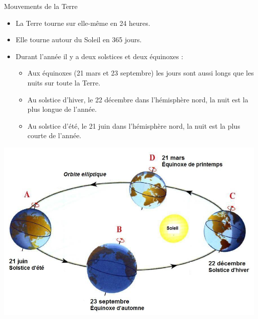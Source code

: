\documentclass[xcolor={dvipsnames}]{beamer}
\begin{document}
\begin{frame}

\begin{block}{Mouvements de la Terre }
	\begin{itemize}
		\item La Terre tourne sur elle-même en 24 heures.
		\item Elle tourne autour du Soleil en 365 jours.
		\item Durant l'année il y a deux solstices et deux équinoxes :
			\begin{itemize}
				\item Aux équinoxes (21 mars et 23 septembre) les jours sont aussi longs que les nuits sur toute la Terre.  
				\item Au solstice d'hiver, le 22 décembre dans l'hémisphère nord, la nuit est la plus longue de l'année.
				\item Au solstice d'été, le 21 juin dans l'hémisphère nord, la nuit est la plus courte de l'année.
			\end{itemize}
	\end{itemize}
\end{block}

	\begin{center}
		\includegraphics[scale=0.2]{solstices}
	\end{center}



\end{frame}
\end{document}

